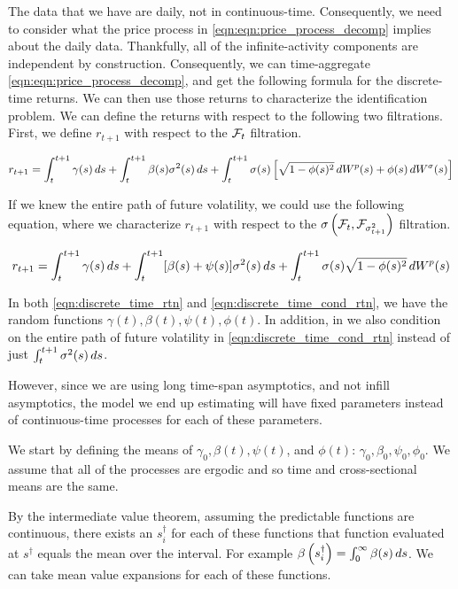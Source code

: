 \documentclass[11pt, letterpaper, twoside, final]{article}
\begin{document}
The data that we have are daily, not in continuous-time. 
Consequently, we need to consider what the price process in  \cref{eqn:eqn:price_process_decomp} implies about the
daily data.
Thankfully, all of the infinite-activity components are independent by construction.
Consequently, we can time-aggregate \cref{eqn:eqn:price_process_decomp}, and get the following formula for the
discrete-time returns.  
We can then use those returns to characterize the identification problem.
We can define the returns with respect to the following two filtrations.
First, we define $r_{t+1}$ with respect to the $\mathcal{F}_{t}$ filtration.

\begin{equation}
    \label{eqn:discrete_time_rtn}
    r_{t+1} = \int_t^{t+1} \gamma(s) \mathop{}\!d s + \int_{t}^{t+1} \beta(s) \sigma^2(s) \mathop{}\!d s +
    \int_t^{t+1} \sigma(s) \left[\sqrt{1 - \phi(s)^2} \mathop{}\!d W^{p}(s) + \phi(s) \mathop{}\!d W^{\sigma}(s)\right]
\end{equation}

If we knew the entire path of future volatility, we could use the following equation, where we characterize
$r_{t+1}$ with respect to the $\sigma\left(\mathcal{F}_{t}, \mathcal{F}_{\sigma^2_{t+1}}\right)$ filtration.

\begin{equation}
    \label{eqn:discrete_time_cond_rtn}
    r_{t+1} = \int_t^{t+1} \gamma(s) \mathop{}\!d s + \int_{t}^{t+1} [\beta(s) + \psi(s)] \sigma^2(s) \mathop{}\!d s +
    \int_t^{t+1} \sigma(s) \sqrt{1-\phi(s)^2} \mathop{}\!d W^{p}(s)
\end{equation}

In both \cref{eqn:discrete_time_rtn} and \cref{eqn:discrete_time_cond_rtn}, we have the random functions
$\gamma(t), \beta(t), \psi(t), \phi(t)$.
In addition, in we also condition on the entire path of future volatility in \cref{eqn:discrete_time_cond_rtn}
instead of just $\int_t^{t+1} \sigma^2(s) \mathop{}\!d s$.

However, since we are using long time-span asymptotics, and not infill asymptotics, the model we end up estimating
will have fixed parameters instead of continuous-time processes for each of these parameters.

We start by defining the means of $\gamma_0, \beta(t), \psi(t)$, and $\phi(t)$: $\gamma_0, \beta_0, \psi_0, \phi_0$.
We assume that all of the processes are ergodic and so time and cross-sectional means are the same.

By the intermediate value theorem, assuming the predictable functions are continuous, there exists an
$s_i^{\dagger}$ for each of these functions that function evaluated at $s^{\dagger}$ equals the mean over the
interval.
For example $\beta\left(s_i^{\dagger}\right) = \int_0^{\infty} \beta(s) \mathop{}\!d s$.  
We can take mean value expansions for each of these functions.
\end{document}
